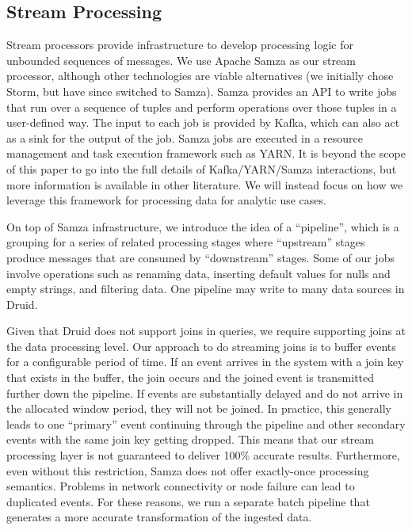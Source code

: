 \documentclass{vldb}
\begin{document}
\subsection{Stream Processing}
\label{sec:streamprocessing}
Stream processors provide infrastructure to develop processing logic for
unbounded sequences of messages. We use Apache Samza as our stream processor,
although other technologies are viable alternatives (we initially chose Storm,
but have since switched to Samza). Samza provides an API to write jobs that run
over a sequence of tuples and perform operations over those tuples in a
user-defined way. The input to each job is provided by Kafka, which can also
act as a sink for the output of the job. Samza jobs are executed in a resource
management and task execution framework such as
YARN\cite{vavilapalli2013apache}. It is beyond the scope of this paper to go
into the full details of Kafka/YARN/Samza interactions, but more information is
available in other literature\cite{2014samza}. We will instead focus on how we
leverage this framework for processing data for analytic use cases.

On top of Samza infrastructure, we introduce the idea of a “pipeline”, which is
a grouping for a series of related processing stages where “upstream” stages
produce messages that are consumed by “downstream” stages. Some of our jobs
involve operations such as renaming data, inserting default values for nulls
and empty strings, and filtering data. One pipeline may write to many data
sources in Druid.

Given that Druid does not support joins in queries, we require supporting joins
at the data processing level. Our approach to do streaming joins is to buffer
events for a configurable period of time. If an event arrives in the system
with a join key that exists in the buffer, the join occurs and the joined event
is transmitted further down the pipeline. If events are substantially delayed
and do not arrive in the allocated window period, they will not be joined. In
practice, this generally leads to one “primary” event continuing through the
pipeline and other secondary events with the same join key getting dropped.
This means that our stream processing layer is not guaranteed to deliver 100\%
accurate results. Furthermore, even without this restriction, Samza does not
offer exactly-once processing semantics. Problems in network connectivity or
node failure can lead to duplicated events. For these reasons, we run a
separate batch pipeline that generates a more accurate transformation of the
ingested data.
\end{document}
